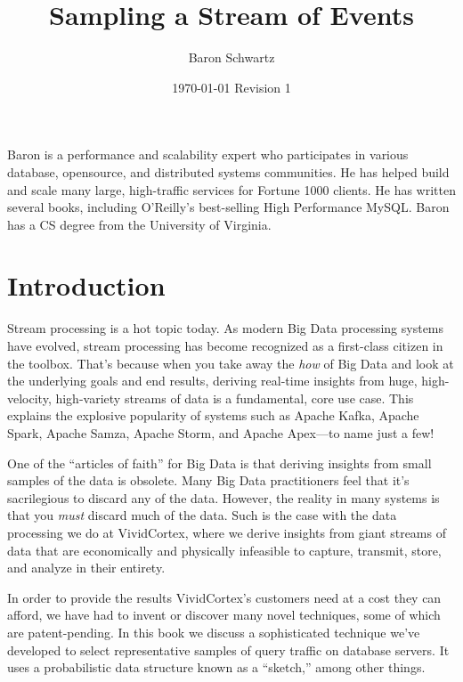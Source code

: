 \documentclass{vivid_layout}
\title{\fontsize{29pt}{15pt}\selectfont Sampling a Stream of Events}{\fontsize{30.2pt}{15pt}\selectfont With a Probabilistic Sketch}
\date{\color{white} \today{} \textbullet{} Revision 1}
\author{Baron Schwartz}{img/baron}
\begin{document}
\maketitle		%
\begin{bio}		%
Baron is a performance and scalability expert who participates in various
database, opensource, and distributed systems communities. He has helped build
and scale many large, high-traffic services for Fortune 1000 clients. He has
written several books, including O'Reilly's best-selling High Performance MySQL.
Baron has a CS degree from the University of Virginia.
\end{bio}
\tableofcontents	%

\section{Introduction}

Stream processing is a hot topic today. As modern Big Data processing systems
have evolved, stream processing has become recognized as a first-class citizen
in the toolbox. That's because when you take away the \emph{how} of Big Data and
look at the underlying goals and end results, deriving real-time insights from
huge, high-velocity, high-variety streams of data is a fundamental, core use
case. This explains the explosive popularity of systems such as Apache Kafka,
Apache Spark, Apache Samza, Apache Storm, and Apache Apex---to name just a few!

One of the ``articles of faith'' for Big Data is that deriving insights from
small samples of the data is obsolete. Many Big Data practitioners feel that
it's sacrilegious to discard any of the data. However, the reality in many
systems is that you \emph{must} discard much of the data. Such is the case with
the data processing we do at VividCortex, where we derive insights from giant
streams of data that are economically and physically infeasible to capture,
transmit, store, and analyze in their entirety.

In order to provide the results VividCortex's customers need at a cost they can
afford, we have had to invent or discover many novel techniques, some of which
are patent-pending. In this book we discuss a sophisticated technique we've
developed to select representative samples of query traffic on database servers.
It uses a probabilistic data structure known as a ``sketch,'' among other
things.
\end{document}
